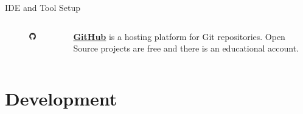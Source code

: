 \documentclass[]{beamer}
\begin{document}
\begin{frame}{IDE and Tool Setup}
{	\begin{columns}
	\begin{column}{0.1\textwidth}
			\begin{figure}
				\includegraphics[width = \textwidth]{../assets/images/logo_github.png}
			\end{figure}
		\end{column}
		\begin{column}{0.85\textwidth}
			\textbf{\href{https://github.com/}{\link GitHub}} is a hosting platform for Git repositories. Open Source projects are free and there is an educational account.
		\end{column}
	\end{columns}
	}
\end{frame}


\section{Development}
\end{document}
